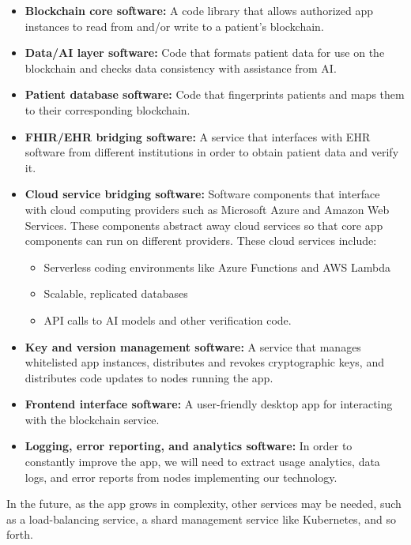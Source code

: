 \documentclass[12pt]{article}
\begin{document}
\begin{itemize}
\item {\bf Blockchain core software:} A code library that allows authorized app instances to read from and/or write to a patient's blockchain.

\item {\bf Data/AI layer software:} Code that formats patient data for use on the blockchain and checks data consistency with assistance from AI.

\item {\bf Patient database software:} Code that fingerprints patients and maps them to their corresponding blockchain.

\item {\bf FHIR/EHR bridging software:} A service that interfaces with EHR software from different institutions in order to obtain patient data and verify it.

\item {\bf Cloud service bridging software:} Software components that interface with cloud computing providers such as Microsoft Azure and Amazon Web Services. These components abstract away cloud services so that core app components can run on different providers. These cloud services include:
	\begin{itemize}
	\item Serverless coding environments like Azure Functions and AWS Lambda

	\item Scalable, replicated databases

	\item API calls to AI models and other verification code.
	\end{itemize}
\item {\bf Key and version management software:} A service that manages whitelisted app instances, distributes and revokes cryptographic keys, and distributes code updates to nodes running the app.
\item {\bf Frontend interface software:} A user-friendly desktop app for interacting with the blockchain service.
\item {\bf Logging, error reporting, and analytics software:} In order to constantly improve the app, we will need to extract usage analytics, data logs, and error reports from nodes implementing our technology.
\end{itemize}

In the future, as the app grows in complexity, other services may be needed, such as a load-balancing service, a shard management service like Kubernetes, and so forth.
\end{document}
